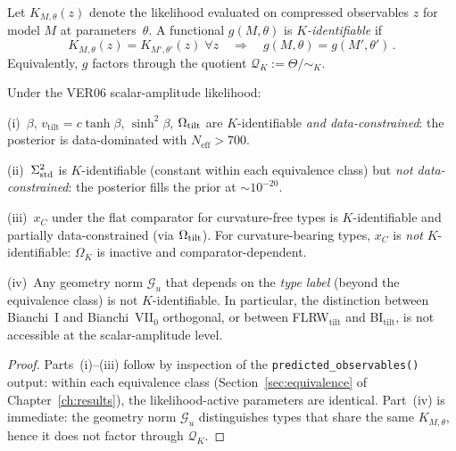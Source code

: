 \begin{definition}
\label{def:K-ident}
Let $K_{M,\theta}(z)$ denote the likelihood evaluated on
compressed observables $z$ for model $M$ at parameters~$\theta$.
A functional $g(M,\theta)$ is \emph{$K$-identifiable} if
\begin{equation}\label{eq:K-ident}
K_{M,\theta}(z) = K_{M',\theta'}(z)\;\forall z
\quad\Longrightarrow\quad
g(M,\theta) = g(M',\theta')\,.
\end{equation}
Equivalently, $g$ factors through the quotient
$\mathcal{Q}_K := \Theta / {\sim_K}$.
\end{definition}

\begin{proposition}
\label{prop:K-audit}
Under the VER06 scalar-amplitude likelihood:

\textup{(i)}~$\beta$, $v_{\mathrm{tilt}} = c\tanh\beta$,
$\sinh^2\!\beta$, $\Omega_{\mathrm{tilt}}$ are $K$-identifiable
\emph{and data-constrained}: the posterior is data-dominated
with $N_{\mathrm{eff}} > 700$.

\textup{(ii)}~$\Sigma^2_{\mathrm{std}}$ is $K$-identifiable (constant within
each equivalence class) but \emph{not data-constrained}:
the posterior fills the prior at $\sim\!10^{-20}$.

\textup{(iii)}~$x_C$ under the flat comparator for
curvature-free types is $K$-identifiable and partially
data-constrained (via $\Omega_{\mathrm{tilt}}$).  For curvature-bearing types,
$x_C$ is \emph{not} $K$-identifiable: $\Omega_K$ is inactive
and comparator-dependent.

\textup{(iv)}~Any geometry norm $\mathcal{G}_u$ that depends on
the \emph{type label} (beyond the equivalence class) is not
$K$-identifiable.  In particular, the distinction between
Bianchi~I and Bianchi~VII$_0$ orthogonal, or between
FLRW$_{\mathrm{tilt}}$ and BI$_{\mathrm{tilt}}$, is not
accessible at the scalar-amplitude level.
\end{proposition}

\begin{proof}
Parts~(i)--(iii) follow by inspection of the
\texttt{predicted\_observables()} output: within each
equivalence class (Section~\ref{sec:equivalence} of
Chapter~\ref{ch:results}), the likelihood-active parameters
are identical.  Part~(iv) is immediate: the geometry norm
$\mathcal{G}_u$ distinguishes types that share the same
$K_{M,\theta}$, hence it does not factor through
$\mathcal{Q}_K$.
\end{proof}


